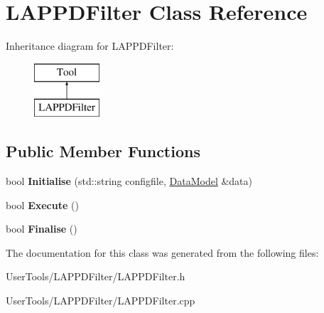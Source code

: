 \hypertarget{classLAPPDFilter}{\section{L\-A\-P\-P\-D\-Filter Class Reference}
\label{classLAPPDFilter}
}
Inheritance diagram for L\-A\-P\-P\-D\-Filter\-:\begin{figure}[H]
\begin{center}
\leavevmode
\includegraphics[height=2.000000cm]{classLAPPDFilter}
\end{center}
\end{figure}
\subsection*{Public Member Functions}
\begin{DoxyCompactItemize}
\item 
\hypertarget{classLAPPDFilter_a43acf78f4842009ea98dbea3cc8dcaee}{bool {\bfseries Initialise} (std\-::string configfile, \hyperlink{classDataModel}{Data\-Model} \&data)}\label{classLAPPDFilter_a43acf78f4842009ea98dbea3cc8dcaee}

\item 
\hypertarget{classLAPPDFilter_a1aea3cb930e491d79248dd24ecd703c8}{bool {\bfseries Execute} ()}\label{classLAPPDFilter_a1aea3cb930e491d79248dd24ecd703c8}

\item 
\hypertarget{classLAPPDFilter_a5d6a46a70be7f2320fe3fe401d3efeba}{bool {\bfseries Finalise} ()}\label{classLAPPDFilter_a5d6a46a70be7f2320fe3fe401d3efeba}

\end{DoxyCompactItemize}


The documentation for this class was generated from the following files\-:\begin{DoxyCompactItemize}
\item 
User\-Tools/\-L\-A\-P\-P\-D\-Filter/L\-A\-P\-P\-D\-Filter.\-h\item 
User\-Tools/\-L\-A\-P\-P\-D\-Filter/L\-A\-P\-P\-D\-Filter.\-cpp\end{DoxyCompactItemize}
